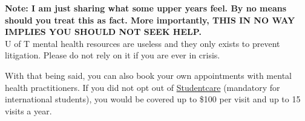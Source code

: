 \textbf{Note: I am just sharing what some upper years feel. By no means should you treat this as fact. More importantly, THIS IN NO WAY IMPLIES YOU SHOULD NOT SEEK HELP.} \\
U of T mental health resources are useless and they only exists to prevent litigation. Please do not rely on it if you are ever in crisis.

With that being said, you can also book your own appointments with mental health practitioners. If you did not opt out of \href{https://studentcare.ca/plan/en-CA/IHaveAPlan_UTSU/understanding-my-coverage}{Studentcare} (mandatory for international students), you would be covered up to \$100 per visit and up to 15 visits a year.
